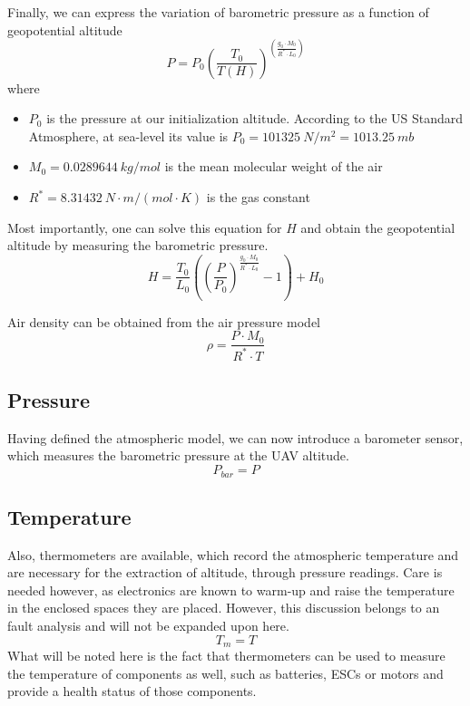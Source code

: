 Finally, we can express the variation of barometric pressure as a function of geopotential altitude
\begin{equation}
	P = P_0\left( \frac{T_{0}}{T(H)} \right) ^ {\left( \frac{g_0 \cdot M_0}{R^* \cdot L_{0}} \right)}
\end{equation}
where
\begin{itemize}
	\item $P_0$ is the pressure at our initialization altitude. According to the US Standard Atmosphere, at sea-level its value is $P_0 = 101325~N/m^2 = 1013.25~mb$
	\item $M_0 = 0.0289644~kg/mol$ is the mean molecular weight of the air
	\item $R^* = 8.31432~N\cdot m / (mol \cdot K)$ is the gas constant
\end{itemize}

Most importantly, one can solve this equation for $H$ and obtain the geopotential altitude by measuring the barometric pressure.
\begin{equation}
	H = \frac{T_0}{L_0}	\left( \left(\frac{P}{P_0}\right)^{\frac{g_0\cdot M_0}{R^* \cdot L_0}} -1\right) + H_0
\end{equation}

Air density can be obtained from the air pressure model
\begin{equation}
	\rho = \frac{P \cdot M_0}{R^* \cdot T}
\end{equation}

\subsection{Pressure}
Having defined the atmospheric model, we can now introduce a barometer sensor, which measures the barometric pressure at the UAV altitude.
\begin{equation}
	P_{bar} = P
\end{equation}

\subsection{Temperature}
Also, thermometers are available, which record the atmospheric temperature and are necessary for the extraction of altitude, through pressure readings. Care is needed however, as electronics are known to warm-up and raise the temperature in the enclosed spaces they are placed. However, this discussion belongs to an fault analysis and will not be expanded upon here.
\begin{equation}
	T_m =  T 
\end{equation}
What will be noted here is the fact that thermometers can be used to measure the temperature of components as well, such as batteries, ESCs or motors and provide a health status of those components.

